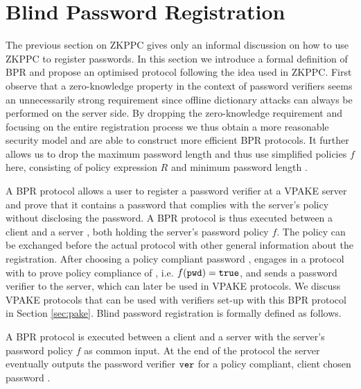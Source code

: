 \section{Blind Password Registration} \label{sec:bpr}

The previous section on \ac{ZKPPC} gives only an informal discussion on how to use \ac{ZKPPC} to register passwords.
In this section we introduce a formal definition of \ac{BPR} and propose an optimised protocol following the idea used in \ac{ZKPPC}.
First observe that a zero-knowledge property in the context of password verifiers seems an unnecessarily strong requirement since offline dictionary attacks can always be performed on the server side.
By dropping the zero-knowledge requirement and focusing on the entire registration process we thus obtain a more reasonable security model and are able to construct more efficient \ac{BPR} protocols.
It further allows us to drop the maximum password length and thus use simplified policies $f$ here, consisting of policy expression $R$ and minimum password length \pmin.

A \ac{BPR} protocol allows a user to register a password verifier at a \ac{VPAKE} server and prove that it contains a password that complies with the server's policy without disclosing the password.
A \ac{BPR} protocol is thus executed between a client \Client and a server \Server, both holding the server's password policy $f$.
The policy can be exchanged before the actual protocol with other general information about the registration.
After choosing a policy compliant password \pwd, \Client engages in a protocol with \Server to prove policy compliance of \pwd, i.e. $f(\mathtt{pwd})=\mathtt{true}$, and sends a password verifier to the server, which can later be used in \ac{VPAKE} protocols.
We discuss \ac{VPAKE} protocols that can be used with verifiers set-up with this \ac{BPR} protocol in Section \ref{sec:pake}.
Blind password registration is formally defined as follows.

\begin{definition}\label{def:bpr}
A \ac{BPR} protocol is executed between a client \Client and a server \Server with the server's password policy $f$ as common input. 
At the end of the protocol the server eventually outputs the password verifier $\mathtt{ver}$ for a policy compliant, client chosen password \pwd. %
\eod
\end{definition}

